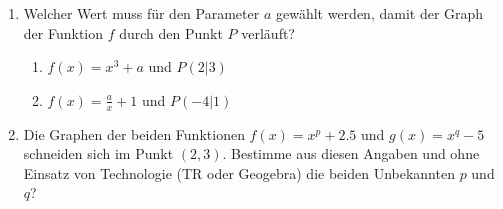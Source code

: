 \documentclass[11pt,oneside]{article}
\begin{document}
\begin{aufgabe}
\begin{enumerate}
\begin{minipage}{0.5\linewidth}
			\end{minipage}
			\hfill
			\begin{minipage}{0.45\linewidth}
				\begin{enumerate}[label=\alph*)]
					\item $f(x)=x^1$
					\item $f(x)=x^3$
					\item $f(x)=x^5$
					\item $f(x)=x^7$
					\item $f(x)=x^9$
					\item $f(x)=x^{11}$
				\end{enumerate}
			\end{minipage}
			\item Welcher Wert muss für den Parameter $a$ gewählt werden, damit der Graph der Funktion $f$ durch den Punkt $P$ verläuft?
			\begin{enumerate}[label=\alph*)]
				\item $f(x)=x^3+a$ und $P(2\vert 3)$
				\item $f(x)=\frac{a}{x}+1$ und $P(-4\vert 1)$
			\end{enumerate}
			\item Die Graphen der beiden Funktionen $f(x)=x^p+2.5$ und $g(x)=x^q-5$ schneiden sich im Punkt $(2,3)$. Bestimme aus diesen Angaben und ohne Einsatz von Technologie (TR oder Geogebra) die beiden Unbekannten $p$ und $q$?
		\end{enumerate}
	\end{aufgabe}
\end{document}
